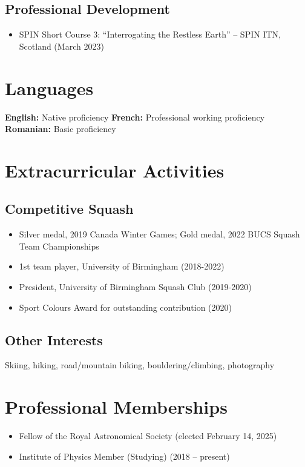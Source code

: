 \documentclass[11pt,a4paper]{article}
\begin{document}
\subsection*{Professional Development}
\begin{itemize}
    \item SPIN Short Course 3: ``Interrogating the Restless Earth'' -- SPIN ITN, Scotland (March 2023)
\end{itemize}

\section*{Languages}

\textbf{English:} Native proficiency \quad \textbf{French:} Professional working proficiency \quad \textbf{Romanian:} Basic proficiency

\section*{Extracurricular Activities}

\subsection*{Competitive Squash}
\begin{itemize}
    \item Silver medal, 2019 Canada Winter Games; Gold medal, 2022 BUCS Squash Team Championships
    \item 1st team player, University of Birmingham (2018-2022)
    \item President, University of Birmingham Squash Club (2019-2020)
    \item Sport Colours Award for outstanding contribution (2020)
\end{itemize}

\subsection*{Other Interests}
Skiing, hiking, road/mountain biking, bouldering/climbing, photography

\section*{Professional Memberships}

\begin{itemize}
    \item Fellow of the Royal Astronomical Society (elected February 14, 2025)
    \item Institute of Physics Member (Studying) (2018 -- present)
\end{itemize}
\end{document}

